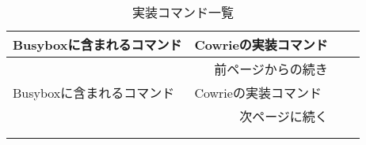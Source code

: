 \begin{longtable}{llp{60mm}p{60mm}}
  \caption{実装コマンド一覧}
  \label{table:command} \\
  \hline
  Busyboxに含まれるコマンド & Cowrieの実装コマンド \\ \hline\hline
  \endfirsthead
  \multicolumn{2}{r}{前ページからの続き} \\ \hline
  Busyboxに含まれるコマンド & Cowrieの実装コマンド \\ \hline\hline
  \endhead
  \hline
  \multicolumn{2}{r}{次ページに続く} \\
  \endfoot
  \hline
  \multicolumn{2}{r}{以上} \\
  \endlastfoot


\end{longtable}
